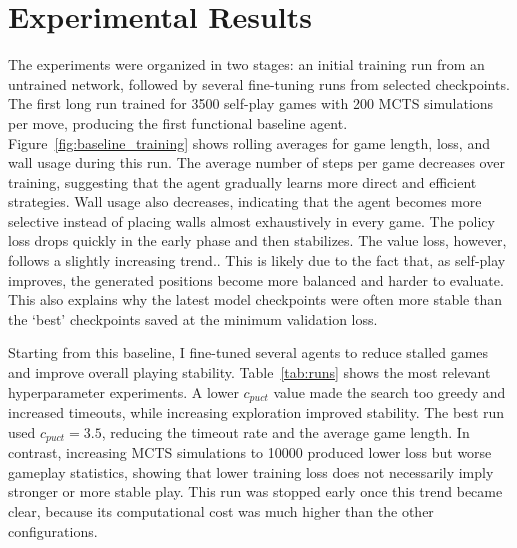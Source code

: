 \documentclass{article}
\begin{document}

\section{Experimental Results}
%
The experiments were organized in two stages: an initial training run from an untrained network, followed by several fine-tuning runs from selected checkpoints. The first long run trained for 3500 self-play games with 200 MCTS simulations per move, producing the first functional baseline agent. Figure~\ref{fig:baseline_training} shows rolling averages for game length, loss, and wall usage during this run.
The average number of steps per game decreases over training, suggesting that
the agent gradually learns more direct and efficient strategies. Wall usage also
decreases, indicating that the agent becomes more selective instead of placing
walls almost exhaustively in every game. The policy loss drops quickly in the early phase and then stabilizes. The value loss,
however,  follows a slightly increasing trend.. This is likely due to the fact that, as self-play improves, the generated positions become more balanced and harder to evaluate. This also explains why the
latest model checkpoints were often more stable than the `best' checkpoints saved at the minimum validation loss.

Starting from this baseline, I fine-tuned several agents to reduce stalled games and improve overall playing stability. Table~\ref{tab:runs} shows the most relevant hyperparameter experiments. A lower \(c_{puct}\) value made the search too greedy and increased timeouts, while increasing exploration improved stability. The best run used \(c_{puct}=3.5\), reducing the timeout rate and the average game length. In contrast, increasing MCTS simulations to 10000 produced lower loss but worse gameplay statistics, showing that lower training loss does not necessarily imply stronger or more stable play. This run was stopped early once this trend became clear, because its computational cost was much higher than the other configurations.
\end{document}
